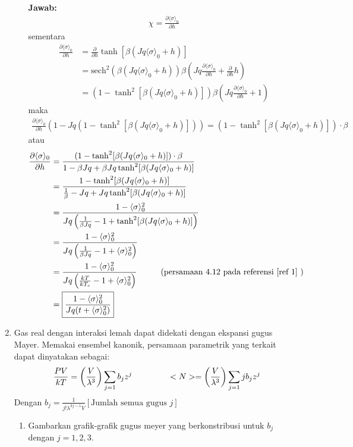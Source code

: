\documentclass[a4paper , 12pt, cc]{article}
\begin{document}
\begin{enumerate}
\begin{enumerate}
\textbf{Jawab:} \newline
\newcommand{\susep}{\langle \sigma \rangle_0} 
\begin{align}
\chi = \frac{\partial \susep}{\partial h}
\end{align}
sementara 
\newcommand{\susun}{\frac{\partial \susep}{\partial h}}
\newcommand{\susur}{\frac{\partial}{\partial h}}
\newcommand{\sech}{\text{sech}}
\begin{align}
\susun & = \susur \tanh [ \beta (J q \susep + h )] \nonumber \\ 
& = \sech^2 \left({\beta (J q \susep + h )} \right) \beta \left( Jq \susun  + \susur h\right) \nonumber \\
& = \left( 1 - \tanh^2 [\beta (J q \susep  + h )]\right) \beta (J q \susun  + 1 ) \nonumber 
\end{align}
maka 
\begin{align}
\susun \left(1 - Jq \left( 1 - \tanh^2 [\beta (Jq \susep + h )]\right) \right) = \left( 1 - \tanh^2 [ \beta (Jq \susep + h )]\right) \cdot \beta
\end{align}
atau 
\begin{align}
\susun &=  \frac{(1 - \tanh^2 [\beta (Jq \susep +h )  ])\cdot\beta}{1 - \beta Jq + \beta Jq \tanh^2 [\beta (Jq \susep + h)]} \nonumber \\
& = \frac{1 - \tanh^2 [\beta (Jq \susep +h )  ]}{\frac{1}{\beta } - Jq + Jq \tanh^2 [\beta (Jq \susep  + h )]} \nonumber \\
& = \frac{1 - \susep^2 }{Jq \left( \frac{1}{\beta Jq } - 1 + \tanh^2 [\beta (Jq \susep + h )]\right)} \nonumber \\
& = \frac{1 - \susep^2 }{Jq \left( \frac{1}{\beta Jq } - 1 + \susep^2 \right)} \nonumber \\
& =\frac{1 - \susep^2 }{ Jq \left( \frac{kT}{kT_c } - 1 + \susep^2 \right)} \hspace{1 cm} \text{(persamaan 4.12 pada referensi \ref{ref 1} ) }   \nonumber \\
& = \boxed{\frac{1 - \susep^2}{Jq (t + \susep^2)}}
\end{align}
\end{enumerate}
\item \label{3} Gas real dengan interaksi lemah dapat didekati dengan ekspansi gugus Mayer.  Memakai ensembel kanonik, persamaan parametrik yang terkait dapat dinyatakan sebagai:
\begin{align}
\frac{PV}{kT} = \left( \frac{V}{\lambda^3}\right)\sum_{j = 1} b_j z^j \hspace{ 1.5 cm} <N> = \left( \frac{V}{\lambda^3} \right) \sum_{j = 1} j b_j z^j
\end{align}
Dengan $\displaystyle b_j  = \frac{1}{j! \lambda^{3j-1 }V} [\text{Jumlah semua gugus }j]$
\begin{enumerate}
\item Gambarkan grafik-grafik gugus meyer yang berkonstribusi untuk $b_j$ dengan $j = 1,2,3.$ 


\end{enumerate}
\end{enumerate}
\end{document}
